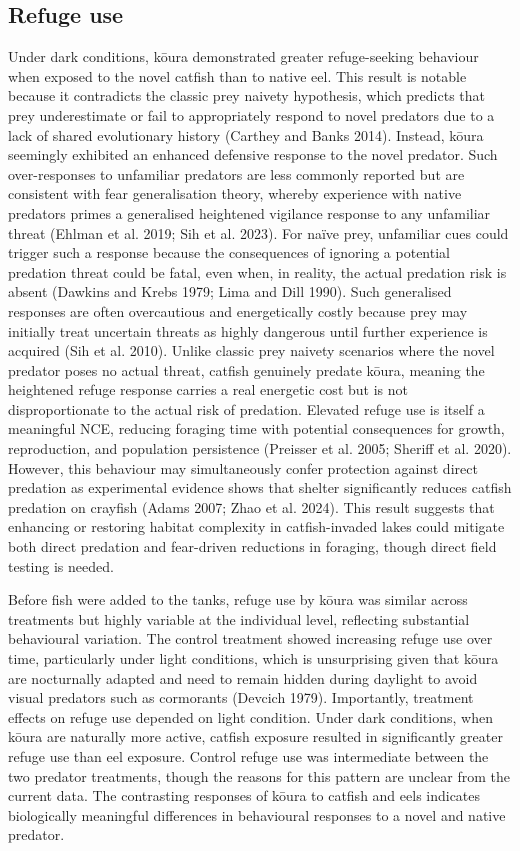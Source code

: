 \documentclass[
  12pt,
  a4paper,
  oneside]{scrbook}
\begin{document}
\subsection{Refuge use}\label{refuge-use}

Under dark conditions, kōura demonstrated greater refuge-seeking
behaviour when exposed to the novel catfish than to native eel. This
result is notable because it contradicts the classic prey naivety
hypothesis, which predicts that prey underestimate or fail to
appropriately respond to novel predators due to a lack of shared
evolutionary history (Carthey and Banks 2014). Instead, kōura seemingly
exhibited an enhanced defensive response to the novel predator. Such
over-responses to unfamiliar predators are less commonly reported but
are consistent with fear generalisation theory, whereby experience with
native predators primes a generalised heightened vigilance response to
any unfamiliar threat (Ehlman et al. 2019; Sih et al. 2023). For naïve
prey, unfamiliar cues could trigger such a response because the
consequences of ignoring a potential predation threat could be fatal,
even when, in reality, the actual predation risk is absent (Dawkins and
Krebs 1979; Lima and Dill 1990). Such generalised responses are often
overcautious and energetically costly because prey may initially treat
uncertain threats as highly dangerous until further experience is
acquired (Sih et al. 2010). Unlike classic prey naivety scenarios where
the novel predator poses no actual threat, catfish genuinely predate
kōura, meaning the heightened refuge response carries a real energetic
cost but is not disproportionate to the actual risk of predation.
Elevated refuge use is itself a meaningful NCE, reducing foraging time
with potential consequences for growth, reproduction, and population
persistence (Preisser et al. 2005; Sheriff et al. 2020). However, this
behaviour may simultaneously confer protection against direct predation
as experimental evidence shows that shelter significantly reduces
catfish predation on crayfish (Adams 2007; Zhao et al. 2024). This
result suggests that enhancing or restoring habitat complexity in
catfish-invaded lakes could mitigate both direct predation and
fear-driven reductions in foraging, though direct field testing is
needed.

Before fish were added to the tanks, refuge use by kōura was similar
across treatments but highly variable at the individual level,
reflecting substantial behavioural variation. The control treatment
showed increasing refuge use over time, particularly under light
conditions, which is unsurprising given that kōura are nocturnally
adapted and need to remain hidden during daylight to avoid visual
predators such as cormorants (Devcich 1979). Importantly, treatment
effects on refuge use depended on light condition. Under dark
conditions, when kōura are naturally more active, catfish exposure
resulted in significantly greater refuge use than eel exposure. Control
refuge use was intermediate between the two predator treatments, though
the reasons for this pattern are unclear from the current data. The
contrasting responses of kōura to catfish and eels indicates
biologically meaningful differences in behavioural responses to a novel
and native predator.
\end{document}
